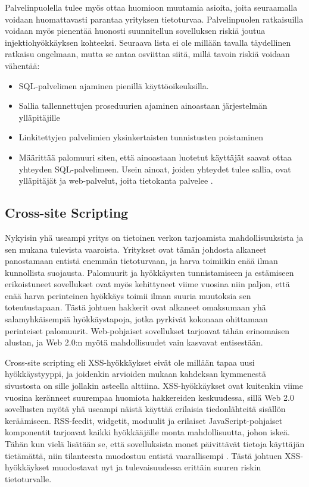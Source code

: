 Palvelinpuolella tulee myös ottaa huomioon muutamia asioita, joita seuraamalla voidaan huomattavasti parantaa yrityksen tietoturvaa.
Palvelinpuolen ratkaisuilla voidaan myös pienentää huonosti suunnitellun sovelluksen riskiä joutua injektiohyökkäyksen kohteeksi. 
Seuraava lista ei ole millään tavalla täydellinen ratkaisu ongelmaan, mutta se antaa osviittaa siitä, millä tavoin riskiä voidaan vähentää:

\begin{itemize}
\item SQL-palvelimen ajaminen pienillä käyttöoikeuksilla.
\item Sallia tallennettujen proseduurien ajaminen ainoastaan järjestelmän ylläpitäjille
\item Linkitettyjen palvelimien yksinkertaisten tunnistusten poistaminen
\item Määrittää palomuuri siten, että ainoastaan luotetut käyttäjät saavat ottaa yhteyden SQL-palvelimeen. Usein ainoat, joiden yhteydet 
      tulee sallia, ovat ylläpitäjät ja web-palvelut, joita tietokanta palvelee \cite{SQLSS}.
\end{itemize}

\subsection{Cross-site Scripting}
Nykyisin yhä useampi yritys on tietoinen verkon tarjoamista mahdollisuuksista ja sen mukana tulevista vaaroista. Yritykset ovat tämän johdosta
alkaneet panostamaan entistä enemmän tietoturvaan, ja harva toimiikin enää ilman kunnollista suojausta. Palomuurit ja hyökkäysten tunnistamiseen
ja estämiseen erikoistuneet sovellukset ovat myös kehittyneet viime vuosina niin paljon, että enää harva perinteinen hyökkäys toimii ilman
suuria muutoksia sen toteutustapaan. Tästä johtuen hakkerit ovat alkaneet omaksumaan yhä salamyhkäisempiä hyökkäystapoja, jotka pyrkivät kokonaan
ohittamaan perinteiset palomuurit. Web-pohjaiset sovellukset tarjoavat tähän erinomaisen alustan, ja Web 2.0:n myötä mahdollisuudet vain kasvavat
entisestään.

Cross-site scripting eli XSS-hyökkäykset eivät ole millään tapaa uusi hyökkäystyyppi, ja joidenkin arvioiden mukaan kahdeksan kymmenestä sivustosta on 
sille jollakin asteella alttiina. XSS-hyökkäykset ovat kuitenkin viime vuosina keränneet suurempaa huomiota hakkereiden keskuudessa, sillä Web 2.0 sovellusten
myötä yhä useampi näistä käyttää erilaisia tiedonlähteitä sisällön keräämiseen. RSS-feedit, widgetit, moduulit ja erilaiset JavaScript-pohjaiset komponentit 
tarjoavat kaikki hyökkääjälle monta mahdollisuutta, johon iskeä. Tähän kun vielä lisätään se, että sovelluksista monet päivittävät tietoja käyttäjän tietämättä, 
niin tilanteesta muodostuu entistä vaarallisempi \cite{WEB2b}. Tästä johtuen XSS-hyökkäykset muodostavat nyt ja tulevaisuudessa erittäin suuren riskin
tietoturvalle.

